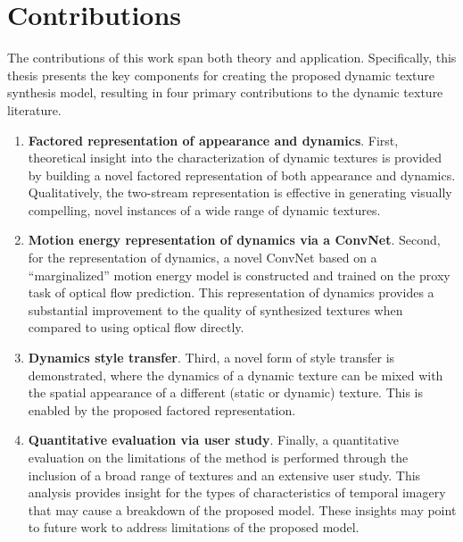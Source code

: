 \section{Contributions}

The contributions of this work span both theory and application. Specifically, this thesis presents the key components for creating the proposed dynamic texture synthesis model, resulting in four primary contributions to the dynamic texture literature.

\begin{enumerate}
	\item \textbf{Factored representation of appearance and dynamics}. First, theoretical insight into the characterization of dynamic textures is provided by building a novel factored representation of both appearance and dynamics. Qualitatively, the two-stream representation is effective in generating visually compelling, novel instances of a wide range of dynamic textures.
	\item \textbf{Motion energy representation of dynamics via a ConvNet}. Second, for the representation of dynamics, a novel ConvNet based on a ``marginalized'' motion energy model \cite{derpanis2010role,derpanis2012spacetime} is constructed and trained on the proxy task of optical flow prediction. This representation of dynamics provides a substantial improvement to the quality of synthesized textures when compared to using optical flow directly.
	\item \textbf{Dynamics style transfer}. Third, a novel form of style transfer is demonstrated, where the dynamics of a dynamic texture can be mixed with the spatial appearance of a different (static or dynamic) texture. This is enabled by the proposed factored representation.
	\item \textbf{Quantitative evaluation via user study}. Finally, a quantitative evaluation on the limitations of the method is performed through the inclusion of a broad range of textures and an extensive user study. This analysis provides insight for the types of characteristics of temporal imagery that may cause a breakdown of the proposed model. These insights may point to future work to address limitations of the proposed model.
\end{enumerate}